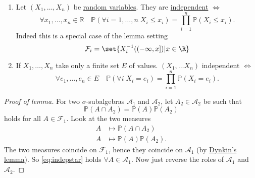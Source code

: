 \documentclass{article}
\newcommand{\1}[1]{\mathbbm{1}_{#1}}
\newcommand{\Prob}{\mathbb{P}}
\begin{document}
\begin{eg}\leavevmode
    \begin{enumerate}[label=(\alph*)]
        \item Let $(X_1, \dotsc, X_n)$ be \hyperlink{def:rv}{random variables}.
            They are \hyperlink{def:indepRV}{independent} $\iff$
            \begin{equation*}
                \forall x_1, \dotsc, x_n \in \mathbb{R} \quad \Prob(\forall i=1,\dotsc,n\; X_i \leq x_i) = \prod_{i=1}^n \Prob(X_i \leq x_i).
            \end{equation*}
            Indeed this is a special case of the lemma setting
            \begin{equation*}
                \mathcal{F}_i = \set{X_i^{-1}((-\infty, x]) | x \in \R} %
            \end{equation*}
        \item If $X_1, \dotsc, X_n$ take only a finite set $E$ of values.
            $(X_1, \dotsc X_n)$ independent $\iff$
            \begin{equation*}
                \forall e_1, \dotsc, e_n \in E \quad \Prob(\forall i \; X_i = e_i) = \prod_{i=1}^n \Prob(X_i = e_i).
            \end{equation*}
    \end{enumerate}
\end{eg}

\begin{proof}[Proof of lemma]
    For two $\sigma$-subalgebras $\mathcal{A}_1$ and $\mathcal{A}_2$, let $A_2 \in \mathcal{A}_2$ be such that
    \begin{equation*}
        \Prob(A \cap A_2) = \Prob(A) \Prob(A_2) \tag{$*$} \label{eq:indepstar}
    \end{equation*}
    holds for all $A \in \mathcal{F}_1$.
    Look at the two measures
    \begin{align*}
        A &\longmapsto \Prob(A \cap A_2) \\
        A &\longmapsto \Prob(A) \Prob(A_2).
    \end{align*}
    The two measures coincide on $\mathcal{F}_1$, hence they coincide on $\mathcal{A}_1$ (by \hyperlink{lem:dynkin}{Dynkin's lemma}).
    So \eqref{eq:indepstar} holds $\forall A \in \mathcal{A}_1$.
    Now just reverse the roles of $\mathcal{A}_1$ and $\mathcal{A}_2$.
\end{proof}
\end{document}
